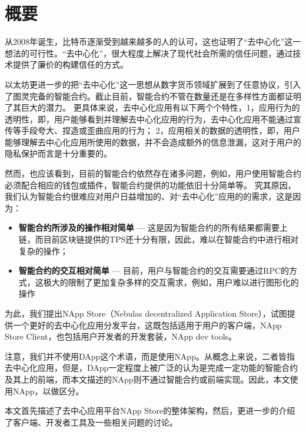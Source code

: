\section{概要}
从2008年诞生，比特币逐渐受到越来越多的人的认可，这也证明了``去中心化''这一想法的可行性。``去中心化''，很大程度上解决了现代社会所需的信任问题，通过技术提供了廉价的构建信任的方式。

以太坊更进一步的把``去中心化''这一思想从数字货币领域扩展到了任意协议，引入了图灵完备的智能合约。截止目前，智能合约不管在数量还是在多样性方面都证明了其巨大的潜力。
更具体来说，去中心化应用有以下两个个特性，1，应用行为的透明性，即，用户能够看到并理解去中心化应用的行为，去中心化应用不能通过宣传等手段夸大、捏造或歪曲应用的行为；
2，应用相关的数据的透明性，即，用户能够理解去中心化应用所使用的数据，并不会造成额外的信息泄漏，这对于用户的隐私保护而言是十分重要的。

然而，也应该看到，目前的智能合约依然存在诸多问题，例如，用户使用智能合约必须配合相应的钱包或插件，智能合约提供的功能依旧十分简单等。
究其原因，我们认为智能合约很难应对用户日益增加的、对``去中心化''应用的的需求，这是因为：
\begin{itemize}
\item \textbf{智能合约所涉及的操作相对简单} --- 这是因为智能合约的所有结果都需要上链，而目前区块链提供的TPS还十分有限，因此，难以在智能合约中进行相对复杂的操作；
\item \textbf{智能合约的交互相对简单} --- 目前，用户与智能合约的交互需要通过RPC的方式，这极大的限制了更加复杂多样的交互需求，例如，用户难以进行图形化的操作
\end{itemize}

为此，我们提出NApp Store（Nebulas decentralized Application Store），试图提供一个更好的去中心化应用分发平台，这既包括适用于用户的客户端，NApp Store Client，也包括用户开发者的开发套装，NApp dev tools。

注意，我们并不使用DApp这个术语，而是使用NApp。从概念上来说，二者皆指去中心化应用，但是，DApp一定程度上被广泛的认为是完成一定功能的智能合约及其上的前端，而本文描述的NApp则不通过智能合约或前端实现。因此，本文使用NApp，以做区分。

本文首先描述了去中心应用平台NApp Store的整体架构，然后，更进一步的介绍了客户端、开发者工具及一些相关问题的讨论。

